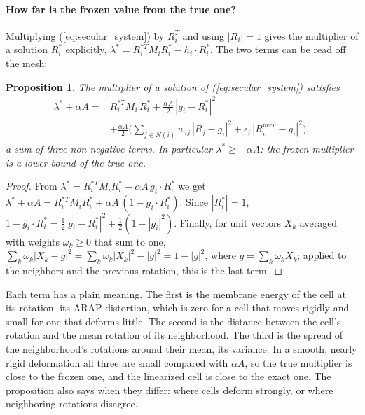 \documentclass{birkjour}
\newtheorem{prop}[thm]{Proposition}
\theoremstyle{remark}
\numberwithin{equation}{section}
\begin{document}
\paragraph{How far is the frozen value from the true one?} Multiplying (\ref{eq:secular_system}) by $R_i^T$ and using $|R_i| = 1$ gives the multiplier of a solution $R^*_i$ explicitly, $\lambda^* = R_i^{*T} M_i R^*_i - h_i \cdot R^*_i$. The two terms can be read off the mesh:
\begin{prop}
\label{prop:multiplier}
The multiplier of a solution of (\ref{eq:secular_system}) satisfies
\begin{equation}
\label{eq:multiplier_gap}
\begin{aligned}
\lambda^* + \alpha A = {} & R_i^{*T} M_i \, R^*_i + \frac{\alpha A}{2} \, |g_i - R^*_i|^2 \\
& + \frac{\alpha A}{2} \Big( \sum_{j \in N(i)} w_{ij} \, |R_j - g_i|^2 + \epsilon_i \, |R^{prev}_i - g_i|^2 \Big),
\end{aligned}
\end{equation}
a sum of three non-negative terms. In particular $\lambda^* \geq -\alpha A$: the frozen multiplier is a lower bound of the true one.
\end{prop}
\begin{proof}
From $\lambda^* = R_i^{*T} M_i R^*_i - \alpha A \, g_i \cdot R^*_i$ we get $\lambda^* + \alpha A = R_i^{*T} M_i R^*_i + \alpha A \, (1 - g_i \cdot R^*_i)$. Since $|R^*_i| = 1$, $1 - g_i \cdot R^*_i = \frac12 |g_i - R^*_i|^2 + \frac12 (1 - |g_i|^2)$. Finally, for unit vectors $X_k$ averaged with weights $\omega_k \geq 0$ that sum to one, $\sum_k \omega_k |X_k - g|^2 = \sum_k \omega_k |X_k|^2 - |g|^2 = 1 - |g|^2$, where $g = \sum_k \omega_k X_k$; applied to the neighbors and the previous rotation, this is the last term.
\end{proof}

Each term has a plain meaning. The first is the membrane energy of the cell at its rotation: its ARAP distortion, which is zero for a cell that moves rigidly and small for one that deforms little. The second is the distance between the cell's rotation and the mean rotation of its neighborhood. The third is the spread of the neighborhood's rotations around their mean, its variance. In a smooth, nearly rigid deformation all three are small compared with $\alpha A$, so the true multiplier is close to the frozen one, and the linearized cell is close to the exact one. The proposition also says when they differ: where cells deform strongly, or where neighboring rotations disagree.
\end{document}
